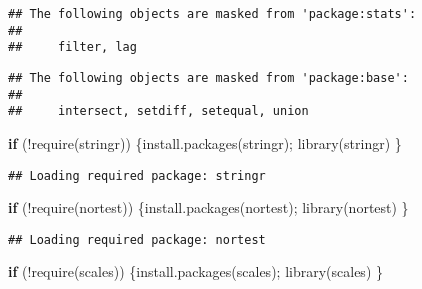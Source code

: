 \documentclass[
]{article}
\newenvironment{Shaded}{\begin{snugshade}}{\end{snugshade}}
\newcommand{\ControlFlowTok}[1]{\textcolor[rgb]{0.13,0.29,0.53}{\textbf{#1}}}
\newcommand{\FunctionTok}[1]{\textcolor[rgb]{0.00,0.00,0.00}{#1}}
\newcommand{\NormalTok}[1]{#1}
\newcommand{\SpecialCharTok}[1]{\textcolor[rgb]{0.00,0.00,0.00}{#1}}
\newcommand{\StringTok}[1]{\textcolor[rgb]{0.31,0.60,0.02}{#1}}
\begin{document}
\begin{verbatim}
## The following objects are masked from 'package:stats':
## 
##     filter, lag
\end{verbatim}

\begin{verbatim}
## The following objects are masked from 'package:base':
## 
##     intersect, setdiff, setequal, union
\end{verbatim}

\begin{Shaded}
\begin{Highlighting}[]
\ControlFlowTok{if}\NormalTok{ (}\SpecialCharTok{!}\FunctionTok{require}\NormalTok{(}\StringTok{\textquotesingle{}stringr\textquotesingle{}}\NormalTok{)) \{}\FunctionTok{install.packages}\NormalTok{(}\StringTok{\textquotesingle{}stringr\textquotesingle{}}\NormalTok{); }\FunctionTok{library}\NormalTok{(}\StringTok{\textquotesingle{}stringr\textquotesingle{}}\NormalTok{)}
\NormalTok{\}}
\end{Highlighting}
\end{Shaded}

\begin{verbatim}
## Loading required package: stringr
\end{verbatim}

\begin{Shaded}
\begin{Highlighting}[]
\ControlFlowTok{if}\NormalTok{ (}\SpecialCharTok{!}\FunctionTok{require}\NormalTok{(}\StringTok{\textquotesingle{}nortest\textquotesingle{}}\NormalTok{)) \{}\FunctionTok{install.packages}\NormalTok{(}\StringTok{\textquotesingle{}nortest\textquotesingle{}}\NormalTok{); }\FunctionTok{library}\NormalTok{(}\StringTok{\textquotesingle{}nortest\textquotesingle{}}\NormalTok{)}
\NormalTok{\}}
\end{Highlighting}
\end{Shaded}

\begin{verbatim}
## Loading required package: nortest
\end{verbatim}

\begin{Shaded}
\begin{Highlighting}[]
\ControlFlowTok{if}\NormalTok{ (}\SpecialCharTok{!}\FunctionTok{require}\NormalTok{(}\StringTok{\textquotesingle{}scales\textquotesingle{}}\NormalTok{)) \{}\FunctionTok{install.packages}\NormalTok{(}\StringTok{\textquotesingle{}scales\textquotesingle{}}\NormalTok{); }\FunctionTok{library}\NormalTok{(}\StringTok{\textquotesingle{}scales\textquotesingle{}}\NormalTok{)}
\NormalTok{\}}
\end{Highlighting}
\end{Shaded}
\end{document}
